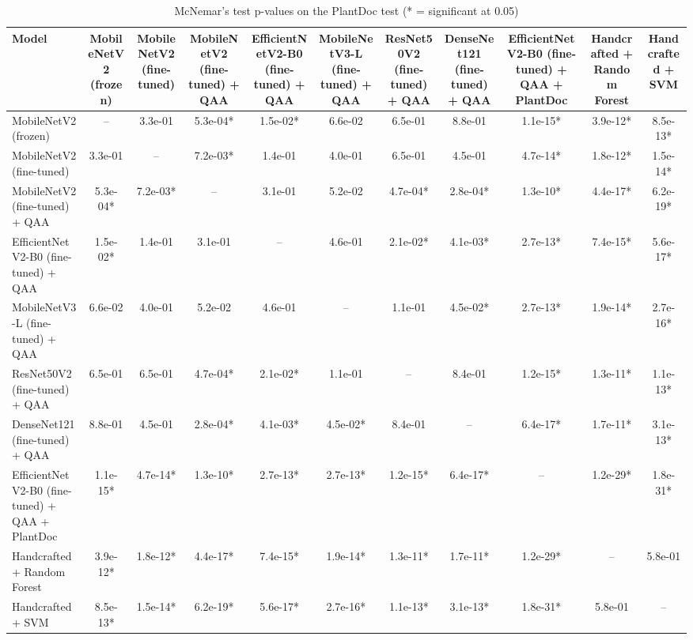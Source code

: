 \begin{table}[t]
\centering
\small
\caption{McNemar's test p-values on the PlantDoc test (* = significant at 0.05)}
\label{tab:table_mcnemar_plantdoc}
\begin{tabular}{lcccccccccc}
\toprule
Model & MobileNetV2 (frozen) & MobileNetV2 (fine-tuned) & MobileNetV2 (fine-tuned) + QAA & EfficientNetV2-B0 (fine-tuned) + QAA & MobileNetV3-L (fine-tuned) + QAA & ResNet50V2 (fine-tuned) + QAA & DenseNet121 (fine-tuned) + QAA & EfficientNetV2-B0 (fine-tuned) + QAA + PlantDoc & Handcrafted + Random Forest & Handcrafted + SVM \\
\midrule
MobileNetV2 (frozen) & – & 3.3e-01 & 5.3e-04* & 1.5e-02* & 6.6e-02 & 6.5e-01 & 8.8e-01 & 1.1e-15* & 3.9e-12* & 8.5e-13* \\
MobileNetV2 (fine-tuned) & 3.3e-01 & – & 7.2e-03* & 1.4e-01 & 4.0e-01 & 6.5e-01 & 4.5e-01 & 4.7e-14* & 1.8e-12* & 1.5e-14* \\
MobileNetV2 (fine-tuned) + QAA & 5.3e-04* & 7.2e-03* & – & 3.1e-01 & 5.2e-02 & 4.7e-04* & 2.8e-04* & 1.3e-10* & 4.4e-17* & 6.2e-19* \\
EfficientNetV2-B0 (fine-tuned) + QAA & 1.5e-02* & 1.4e-01 & 3.1e-01 & – & 4.6e-01 & 2.1e-02* & 4.1e-03* & 2.7e-13* & 7.4e-15* & 5.6e-17* \\
MobileNetV3-L (fine-tuned) + QAA & 6.6e-02 & 4.0e-01 & 5.2e-02 & 4.6e-01 & – & 1.1e-01 & 4.5e-02* & 2.7e-13* & 1.9e-14* & 2.7e-16* \\
ResNet50V2 (fine-tuned) + QAA & 6.5e-01 & 6.5e-01 & 4.7e-04* & 2.1e-02* & 1.1e-01 & – & 8.4e-01 & 1.2e-15* & 1.3e-11* & 1.1e-13* \\
DenseNet121 (fine-tuned) + QAA & 8.8e-01 & 4.5e-01 & 2.8e-04* & 4.1e-03* & 4.5e-02* & 8.4e-01 & – & 6.4e-17* & 1.7e-11* & 3.1e-13* \\
EfficientNetV2-B0 (fine-tuned) + QAA + PlantDoc & 1.1e-15* & 4.7e-14* & 1.3e-10* & 2.7e-13* & 2.7e-13* & 1.2e-15* & 6.4e-17* & – & 1.2e-29* & 1.8e-31* \\
Handcrafted + Random Forest & 3.9e-12* & 1.8e-12* & 4.4e-17* & 7.4e-15* & 1.9e-14* & 1.3e-11* & 1.7e-11* & 1.2e-29* & – & 5.8e-01 \\
Handcrafted + SVM & 8.5e-13* & 1.5e-14* & 6.2e-19* & 5.6e-17* & 2.7e-16* & 1.1e-13* & 3.1e-13* & 1.8e-31* & 5.8e-01 & – \\
\bottomrule
\end{tabular}
\end{table}
